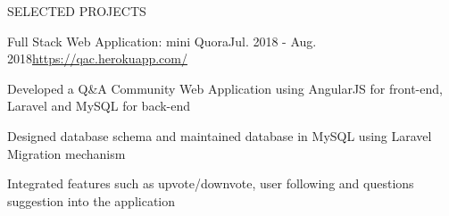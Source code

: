 \documentclass{resume} %
\begin{document}

\begin{rSection}{SELECTED PROJECTS}








\begin{rSubsection}{Full Stack Web Application: mini Quora}{Jul. 2018 - Aug. 2018}{\url{https://qac.herokuapp.com/}}{}
\item Developed a Q\&A Community Web Application using AngularJS for front-end, Laravel and MySQL for back-end
\item Designed database schema and maintained database in MySQL using Laravel Migration mechanism
\item Integrated features such as upvote/downvote, user following and questions suggestion into the application
\end{rSubsection} 


\end{rSection}
\end{document}
